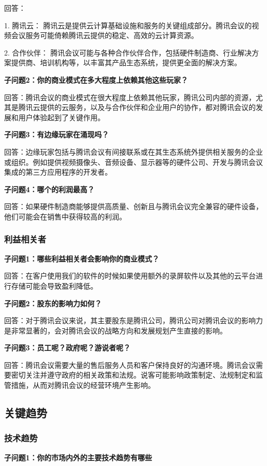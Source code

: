 \documentclass[a4paper,12pt]{article}
\begin{document}
    回答：
    
    1. 腾讯云： 腾讯云是提供云计算基础设施和服务的关键组成部分。腾讯会议的视频会议服务可能倚赖腾讯云提供的稳定、高效的云计算资源。

    2. 合作伙伴： 腾讯会议可能与各种合作伙伴合作，包括硬件制造商、行业解决方案提供商、培训机构等，以丰富其产品生态系统，提供更全面的解决方案。

    \textbf{子问题2：你的商业模式在多大程度上依赖其他这些玩家？}

    回答：腾讯会议的商业模式在很大程度上依赖其他玩家，腾讯公司内部的资源，尤其是腾讯云提供的云服务，以及与合作伙伴和企业用户的协作，都对腾讯会议的发展和用户体验起到了关键作用。

    \textbf{子问题3：有边缘玩家在涌现吗？}

    回答：边缘玩家包括与腾讯会议有间接联系或在其生态系统外提供相关服务的企业或组织。例如提供视频摄像头、音频设备、显示器等的硬件公司、开发与腾讯会议集成的第三方应用程序的开发者。

    \textbf{子问题4：哪个的利润最高？}

    回答：如果硬件制造商能够提供高质量、创新且与腾讯会议完全兼容的硬件设备，他们可能会在销售中获得较高的利润。
    
    \subsubsection{利益相关者}
    \textbf{子问题1：哪些利益相关者会影响你的商业模式？}
    
    回答：在客户使⽤我们的软件的时候如果使⽤额外的录屏软件以及其他的云平台进⾏存储可能会导致盈利降低。

    \textbf{子问题2：股东的影响力如何？}

    回答：对于腾讯会议来说，其主要股东是腾讯公司，腾讯公司对腾讯会议的影响力是非常显著的，会对腾讯会议的战略方向和发展规划产生直接的影响。

    \textbf{子问题3：员工呢？政府呢？游说者呢？}

    回答：腾讯会议需要⼤量的售后服务⼈员和客户保持良好的沟通环境。腾讯会议需要密切关注并遵守政府的相关政策和法规。说客可能影响政策制定、法规制定和监管措施，从而对腾讯会议的经营环境产生影响。
    
    \subsection{关键趋势}
    \subsubsection{技术趋势}
    \textbf{子问题1：你的市场内外的主要技术趋势有哪些}
\end{document}
